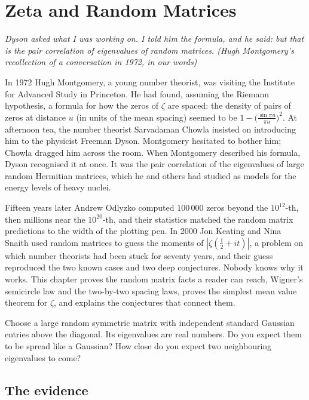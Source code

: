 \chapter{Zeta and Random Matrices}\label{ch:zetarmt}

\begin{center}\itshape
Dyson asked what I was working on. I told him the formula, and he said: but that is the pair correlation of eigenvalues of random matrices.
\upshape(Hugh Montgomery's recollection of a conversation in 1972, in our words)
\end{center}

In 1972 Hugh Montgomery, a young number theorist, was visiting the Institute for Advanced Study in Princeton. He had
found, assuming the Riemann hypothesis, a formula for how the zeros of $\zeta$ are spaced: the density of pairs of zeros at distance $u$ (in units of
the mean spacing) seemed to be $1-\bigl(\frac{\sin\pi u}{\pi u}\bigr)^2$. At afternoon tea, the number theorist Sarvadaman Chowla insisted on
introducing him to the physicist Freeman Dyson. Montgomery hesitated to bother him; Chowla dragged him across the room. When Montgomery described his
formula, Dyson recognised it at once. It was the pair correlation of the eigenvalues of large random Hermitian matrices, which he and others had
studied as models for the energy levels of heavy nuclei.

Fifteen years later Andrew Odlyzko computed $100\,000$ zeros beyond the $10^{12}$-th, then millions near the $10^{20}$-th, and their statistics matched
the random matrix predictions to the width of the plotting pen. In 2000 Jon Keating and Nina Snaith used random matrices to guess the moments of
$|\zeta(\frac12+it)|$, a problem on which number theorists had been stuck for seventy years, and their guess reproduced the two known cases and two
deep conjectures. Nobody knows why it works. This chapter proves the random matrix facts a reader can reach, Wigner's semicircle law and the
two-by-two spacing laws, proves the simplest mean value theorem for $\zeta$, and explains the conjectures that connect them.

\begin{think}
Choose a large random symmetric matrix with independent standard Gaussian entries above the diagonal. Its eigenvalues are real numbers. Do you expect them
to be spread like a Gaussian? How close do you expect two neighbouring eigenvalues to come?
\end{think}

\section{The evidence}

